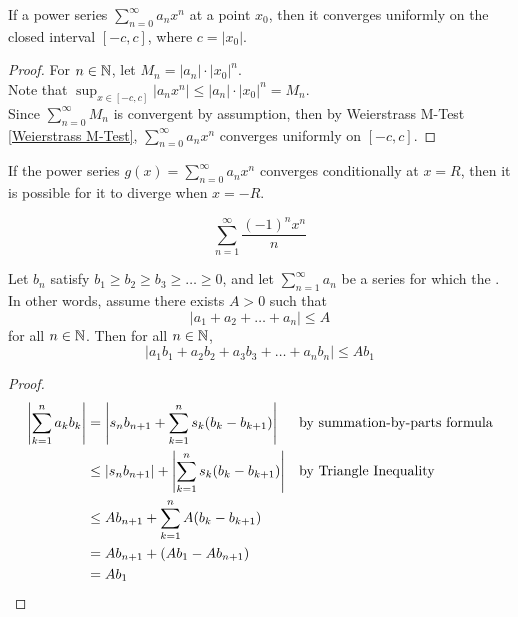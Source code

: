 \documentclass[11pt]{article}
\begin{document}
\theorem If a power series $\sum_{n=0}^\infty a_nx^n$  at a point $x_0$, then it converges uniformly on the closed interval $[-c, c]$, where $c = |x_0|$.
\begin{proof}
	For $n \in \mathbb{N}$, let $M_n = |a_n|\cdot|x_0|^n$.\\
	Note that $\sup_{x \in [-c,c]} |a_nx^n| \leq |a_n|\cdot|x_0|^n = M_n$.\\
	Since $\sum_{n=0}^\infty M_n$ is convergent by assumption, then by Weierstrass M-Test \ref{Weierstrass M-Test}, $\sum_{n=0}^\infty a_nx^n$ converges uniformly on $[-c,c]$.
\end{proof}

\remark
If the power series $g(x) = \sum_{n=0}^\infty a_nx^n$ converges conditionally at $x = R$, then it is possible for it to diverge when $x = -R$.

\example
$$\sum_{n=1}^\infty \frac{(-1)^nx^n}{n}$$

 Let $b_n$ satisfy $b_1 \geq b_2 \geq b_3 \geq \hdots \geq 0$, and let $\sum_{n=1}^\infty a_n$ be a series for which the . In other words, assume there exists $A > 0$ such that
	$$|a_1 + a_2 + \hdots + a_n| \leq A$$
	for all $n \in \mathbb{N}$. Then for all $n \in \mathbb{N}$,
	$$|a_1b_1 + a_2b_2 + a_3b_3 + \hdots + a_nb_n| \leq Ab_1$$
\begin{proof}
	\begin{align*}
		\left \vert {\sum_{k=1}^n a_kb_k} \right \vert &= \left \vert {s_nb_{n+1} + \sum_{k=1}^n s_k(b_k - b_{k+1})} \right \vert &&\text{by summation-by-parts formula} \\
		&\leq \left \vert {s_nb_{n+1}} \right \vert + \left \vert {\sum_{k=1}^n s_k(b_k - b_{k+1})} \right \vert  &&\text{by Triangle Inequality} \\
		&\leq A b_{n+1} + \sum_{k=1}^n A(b_k - b_{k+1}) \\
		&= Ab_{n+1} + (Ab_1 - Ab_{n+1}) \\
		&= Ab_1
	\end{align*}
\end{proof}
\end{document}
